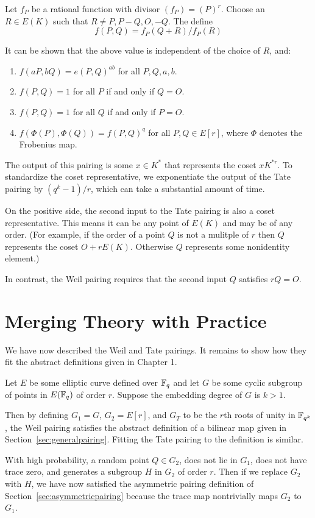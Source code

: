 Let $f_P$ be a rational function with divisor $(f_P) = (P)^r$.
Choose an $R\in E(K)$ such that $R \ne P, P-Q, O, -Q$. The define
\[
f(P, Q) = f_P (Q + R) / f_P (R)
\]

It can be shown that the above value is independent of the choice of $R$,
and:
\begin{enumerate}
\item
$f(a P, b Q) = e(P, Q)^{a b}$ for all $P, Q, a, b$.
\item
$f(P,Q) = 1$ for all $P$ if and only if $Q = O$.
\item
$f(P,Q) = 1$ for all $Q$ if and only if $P = O$.
\item
$f(\Phi(P),\Phi(Q)) = f(P,Q)^{q}$ for all $P,Q \in E[r]$,
where $\Phi$ denotes the Frobenius map.
\end{enumerate}

The output of this pairing is some $x \in K^*$
that represents the coset $x K^{*r}$. To standardize the coset
representative, we exponentiate the output of the Tate pairing
by $(q^k - 1) / r$, which can take a substantial amount of time.

On the positive side, the second input to the Tate pairing is also a coset
representative. This means it can be any point of $E(K)$ and may
be of any order. (For example,
if the order of a point $Q$ is not a mulitple of $r$ then $Q$ represents
the coset $O + r E(K)$. Otherwise $Q$ represents some nonidentity
element.)

In contrast, the Weil pairing requires that the second
input $Q$ satisfies $r Q = O$.

\section {Merging Theory with Practice}

We have now described the Weil and Tate pairings. It remains to show
how they fit the abstract definitions given in Chapter 1.

Let $E$ be some elliptic curve defined over $\mathbb{F}_q$ and let $G$ be some
cyclic subgroup of points in $E(\mathbb{F}_q)$ of order $r$.
Suppose the embedding degree of $G$ is $k > 1$.

Then by defining $G_1 = G$, $G_2 = E[r]$, and $G_T$ to be the $r$th roots
of unity in $\mathbb{F}_{q^k}$, the Weil pairing satisfies the abstract
definition of a bilinear map given in Section~\ref{sec:generalpairing}.
Fitting the Tate pairing to the definition is similar.

With high probability, a random point $Q \in G_2$, does not
lie in $G_1$, does not have trace zero,
and generates a subgroup $H$ in $G_2$ of order $r$. Then
if we replace $G_2$ with $H$, we have now satisfied the asymmetric pairing
definition of Section~\ref{sec:asymmetricpairing} because the
trace map nontrivially maps $G_2$ to $G_1$.

